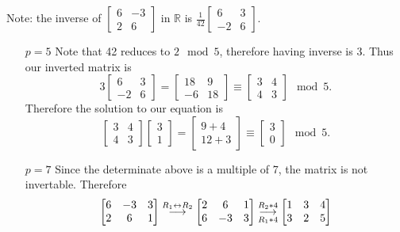 \documentclass[12pt, letterpaper]{article}
\newcommand{\R}{\mathbb{R}}
\newcommand{\grstep}[2][\relax]{%
   \ensuremath{\mathrel{
       {\mathop{\longrightarrow}\limits^{#2\mathstrut}_{
                                     \begin{subarray}{l} #1 \end{subarray}}}}}}
\newcommand{\swap}{\leftrightarrow}
\begin{document}
\begin{enumerate}
	Note: the inverse of $\begin{bmatrix}6 & -3\\ 2 & 6 \end{bmatrix}$ in $\R$ is 
	$\frac{1}{42}\begin{bmatrix}6 & 3\\ -2 & 6 \end{bmatrix}$.
	\begin{enumerate}
		\item[$p=5$] 
			Note that 42 reduces to $2 \mod 5$, therefore having inverse is $3$.
			Thus our inverted matrix is 
			$$
			3 \begin{bmatrix}6 & 3\\ -2 & 6 \end{bmatrix} = \begin{bmatrix}18 & 9\\ -6 & 18 \end{bmatrix} \equiv \begin{bmatrix}3 & 4\\ 4 & 3 \end{bmatrix} \mod{5}.
			$$
			Therefore the solution to our equation is 
			$$
			\begin{bmatrix}3 & 4\\ 4 & 3 \end{bmatrix} \begin{bmatrix} 3 \\ 1\end{bmatrix} = \begin{bmatrix} 9 + 4\\12 + 3	\end{bmatrix} \equiv \begin{bmatrix} 3\\0	\end{bmatrix} \mod{5}.
			$$
		\item[$p=7$] Since the determinate above is a multiple of 7, the matrix is not invertable. Therefore
		\begin{align*}
			\begin{bmatrix}6 & -3 & 3\\ 2 & 6 & 1 \end{bmatrix} \grstep[]{R_1 \swap R_2} 
			\begin{bmatrix}2 & 6 & 1\\ 6 & -3 & 3  \end{bmatrix}
			\grstep[R_1 * 4]{R_2 *4} \begin{bmatrix}1 & 3 & 4\\ 3 & 2 & 5 \end{bmatrix}\\

\end{align*}
\end{enumerate}
\end{enumerate}
\end{document}
